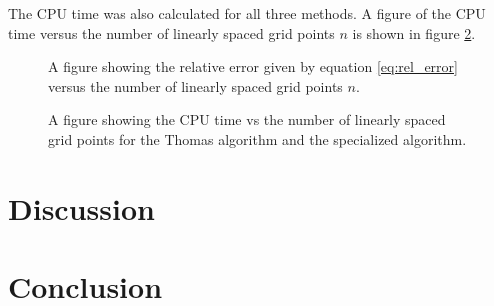 \documentclass[twocolumn]{aastex62}
\begin{document}
The CPU time was also calculated for all three methods. A figure of the CPU time versus the number of linearly spaced grid points $n$ is shown in figure \ref{fig:CPUtimeplot}. 

\begin{figure}[ht]
	\caption{A figure showing the relative error given by equation \ref{eq:rel_error}  versus the number of linearly spaced grid points $n$.}
	\label{fig:specerror}
\end{figure}

\begin{figure}[ht]
	\caption{A figure showing the CPU time vs the number of linearly spaced grid points for the Thomas algorithm and the specialized algorithm. }	\label{fig:CPUtimeplot}
\end{figure}






\section{Discussion} \label{sec:discussion}

\section{Conclusion} \label{sec:conclusion}

\
\end{document}
